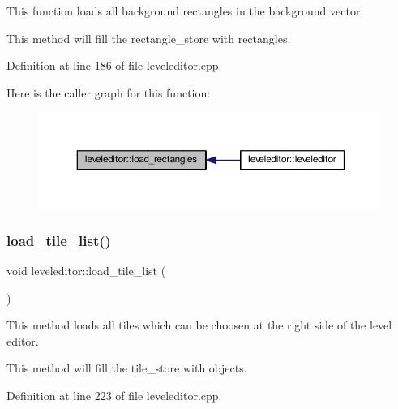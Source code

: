 This function loads all background rectangles in the background vector. 

This method will fill the rectangle\+\_\+store with rectangles. 

Definition at line 186 of file leveleditor.\+cpp.

Here is the caller graph for this function\+:
\nopagebreak
\begin{figure}[H]
\begin{center}
\leavevmode
\includegraphics[width=350pt]{classleveleditor_a675038d66c5ea045d4e3b922e28a23ec_icgraph}
\end{center}
\end{figure}
\mbox{\label{classleveleditor_ad34dad62ef7c5ea26250b97e9803776a}} 
\subsubsection{\texorpdfstring{load\+\_\+tile\+\_\+list()}{load\_tile\_list()}}
{\footnotesize\ttfamily void leveleditor\+::load\+\_\+tile\+\_\+list (\begin{DoxyParamCaption}{ }\end{DoxyParamCaption})\hspace{0.3cm}{\ttfamily [private]}}



This method loads all tiles which can be choosen at the right side of the level editor. 

This method will fill the tile\+\_\+store with objects. 

Definition at line 223 of file leveleditor.\+cpp.

